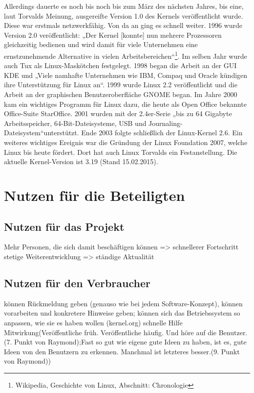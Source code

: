 \documentclass[a4paper,12pt]{article}
\begin{document}
Allerdings dauerte es noch bis noch bis zum März des nächsten Jahres, bis eine, laut Torvalds Meinung, ausgereifte Version 1.0 des Kernels veröffentlicht wurde. Diese war erstmals netzwerkfähig. Von da an ging es schnell weiter. 1996 wurde Version 2.0 veröffentlicht: „Der Kernel [konnte] nun mehrere Prozessoren gleichzeitig bedienen und wird damit für viele Unternehmen eine ernstzunehmende Alternative in vielen Arbeitsbereichen“\footnote{Wikipedia, Geschichte von Linux, Abschnitt: Chronologie}. Im selben Jahr wurde auch Tux als Linux-Maskötchen festgelegt. 1998 began die Arbeit an der GUI KDE und „Viele namhafte Unternehmen wie IBM, Compaq und Oracle kündigen ihre Unterstützung für Linux an“\footnotemark[17]. 1999 wurde Linux 2.2 veröffentlicht und die Arbeit an der graphischen Benutzeroberfläche GNOME began. Im Jahre 2000 kam ein wichtiges Programm für Linux dazu, die heute als Open Office bekannte Office-Suite StarOffice. 2001 wurden mit der 2.4er-Serie „bis zu 64 Gigabyte Arbeitsspeicher, 64-Bit-Dateisysteme, USB und Journaling-Dateisystem“\footnotemark[17] unterstützt. Ende 2003 folgte schließlich der Linux-Kernel 2.6. Ein weiteres wichtiges Ereignis war die Gründung der Linux Foundation 2007, welche Linux bis heute fördert. Dort hat auch Linux Torvalds ein Festanstellung. Die aktuelle Kernel-Version ist 3.19 (Stand 15.02.2015).
\section{Nutzen für die Beteiligten}
\subsection{Nutzen für das Projekt}
Mehr Personen, die sich damit beschäftigen können => schnellerer Fortschritt
stetige Weiterentwicklung => ständige Aktualität
\subsection{Nutzen für den Verbraucher}
können Rückmeldung geben (genauso wie bei jedem Software-Konzept), können vorarbeiten und konkretere Hinweise geben;
können sich das Betriebssystem so anpassen, wie sie es haben wollen (kernel.org)
schnelle Hilfe
Mitwirkung(Veröffentliche früh. Veröffentliche häufig. Und höre auf die Benutzer.(7. Punkt von Raymond);Fast so gut wie eigene gute Ideen zu haben, ist es, gute Ideen von den Benutzern zu erkennen. Manchmal ist letzteres besser.(9. Punkt von Raymond))
\end{document}
